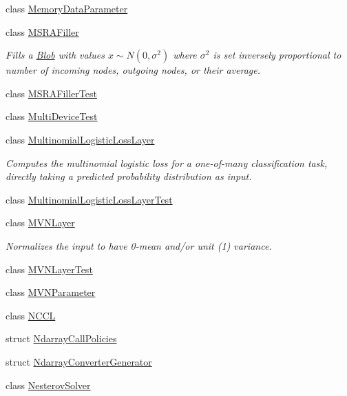 \begin{DoxyCompactItemize}
\item 
class \mbox{\hyperlink{classcaffe_1_1_memory_data_parameter}{Memory\+Data\+Parameter}}
\item 
class \mbox{\hyperlink{classcaffe_1_1_m_s_r_a_filler}{M\+S\+R\+A\+Filler}}
\begin{DoxyCompactList}\small\item\em Fills a \mbox{\hyperlink{classcaffe_1_1_blob}{Blob}} with values $ x \sim N(0, \sigma^2) $ where $ \sigma^2 $ is set inversely proportional to number of incoming nodes, outgoing nodes, or their average. \end{DoxyCompactList}\item 
class \mbox{\hyperlink{classcaffe_1_1_m_s_r_a_filler_test}{M\+S\+R\+A\+Filler\+Test}}
\item 
class \mbox{\hyperlink{classcaffe_1_1_multi_device_test}{Multi\+Device\+Test}}
\item 
class \mbox{\hyperlink{classcaffe_1_1_multinomial_logistic_loss_layer}{Multinomial\+Logistic\+Loss\+Layer}}
\begin{DoxyCompactList}\small\item\em Computes the multinomial logistic loss for a one-\/of-\/many classification task, directly taking a predicted probability distribution as input. \end{DoxyCompactList}\item 
class \mbox{\hyperlink{classcaffe_1_1_multinomial_logistic_loss_layer_test}{Multinomial\+Logistic\+Loss\+Layer\+Test}}
\item 
class \mbox{\hyperlink{classcaffe_1_1_m_v_n_layer}{M\+V\+N\+Layer}}
\begin{DoxyCompactList}\small\item\em Normalizes the input to have 0-\/mean and/or unit (1) variance. \end{DoxyCompactList}\item 
class \mbox{\hyperlink{classcaffe_1_1_m_v_n_layer_test}{M\+V\+N\+Layer\+Test}}
\item 
class \mbox{\hyperlink{classcaffe_1_1_m_v_n_parameter}{M\+V\+N\+Parameter}}
\item 
class \mbox{\hyperlink{classcaffe_1_1_n_c_c_l}{N\+C\+CL}}
\item 
struct \mbox{\hyperlink{structcaffe_1_1_ndarray_call_policies}{Ndarray\+Call\+Policies}}
\item 
struct \mbox{\hyperlink{structcaffe_1_1_ndarray_converter_generator}{Ndarray\+Converter\+Generator}}
\item 
class \mbox{\hyperlink{classcaffe_1_1_nesterov_solver}{Nesterov\+Solver}}

\end{DoxyCompactItemize}
